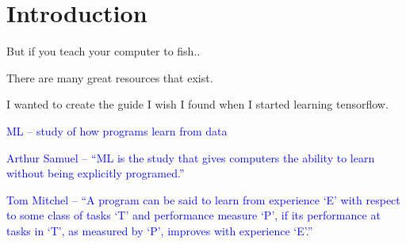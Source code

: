 \chapter{Introduction}

But if you teach your computer to fish..


There are many great resources that exist.

I wanted to create the guide I wish I found when I started learning tensorflow.


%
\textcolor{blue}{ML -- study of how programs learn from data}

\textcolor{blue}{Arthur Samuel -- ``ML is the study that gives computers the ability to learn without being explicitly programed.''}

\textcolor{blue}{Tom Mitchel -- ``A program can be said to learn from experience `E' with respect to some class of tasks `T' and performance measure `P', if its performance at tasks in `T', as measured by `P', improves with experience `E'.''}